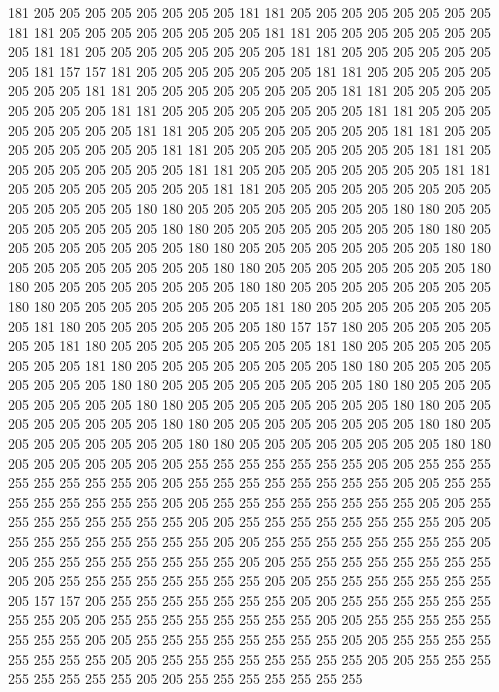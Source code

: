 181 205 205 205 205 205 205 205 205 181 181 205 205 205 205 205 205 205 205 181
181 205 205 205 205 205 205 205 205 181 181 205 205 205 205 205 205 205 205 181
181 205 205 205 205 205 205 205 205 181 181 205 205 205 205 205 205 205 181 157
157 181 205 205 205 205 205 205 205 181 181 205 205 205 205 205 205 205 205 181
181 205 205 205 205 205 205 205 205 181 181 205 205 205 205 205 205 205 205 181
181 205 205 205 205 205 205 205 205 181 181 205 205 205 205 205 205 205 205 181
181 205 205 205 205 205 205 205 205 181 181 205 205 205 205 205 205 205 205 181
181 205 205 205 205 205 205 205 205 181 181 205 205 205 205 205 205 205 205 181
181 205 205 205 205 205 205 205 205 181 181 205 205 205 205 205 205 205 205 181
181 205 205 205 205 205 205 205 205 205 205 205 205 205 205 180 180 205 205 205
205 205 205 205 205 180 180 205 205 205 205 205 205 205 205 180 180 205 205 205
205 205 205 205 205 180 180 205 205 205 205 205 205 205 205 180 180 205 205 205
205 205 205 205 205 180 180 205 205 205 205 205 205 205 205 180 180 205 205 205
205 205 205 205 205 180 180 205 205 205 205 205 205 205 205 180 180 205 205 205
205 205 205 205 205 180 180 205 205 205 205 205 205 205 205 181 180 205 205 205
205 205 205 205 205 181 180 205 205 205 205 205 205 205 180 157 157 180 205 205
205 205 205 205 205 181 180 205 205 205 205 205 205 205 205 181 180 205 205 205
205 205 205 205 205 181 180 205 205 205 205 205 205 205 205 180 180 205 205 205
205 205 205 205 205 180 180 205 205 205 205 205 205 205 205 180 180 205 205 205
205 205 205 205 205 180 180 205 205 205 205 205 205 205 205 180 180 205 205 205
205 205 205 205 205 180 180 205 205 205 205 205 205 205 205 180 180 205 205 205
205 205 205 205 205 180 180 205 205 205 205 205 205 205 205 180 180 205 205 205
205 205 205 205 255 255 255 255 255 255 255 205 205 255 255 255 255 255 255 255
255 205 205 255 255 255 255 255 255 255 255 205 205 255 255 255 255 255 255 255
255 205 205 255 255 255 255 255 255 255 255 205 205 255 255 255 255 255 255 255
255 205 205 255 255 255 255 255 255 255 255 205 205 255 255 255 255 255 255 255
255 205 205 255 255 255 255 255 255 255 255 205 205 255 255 255 255 255 255 255
255 205 205 255 255 255 255 255 255 255 255 205 205 255 255 255 255 255 255 255
255 205 205 255 255 255 255 255 255 255 205 157 157 205 255 255 255 255 255 255
255 205 205 255 255 255 255 255 255 255 255 205 205 255 255 255 255 255 255 255
255 205 205 255 255 255 255 255 255 255 255 205 205 255 255 255 255 255 255 255
255 205 205 255 255 255 255 255 255 255 255 205 205 255 255 255 255 255 255 255
255 205 205 255 255 255 255 255 255 255 255 205 205 255 255 255 255 255 255 255
